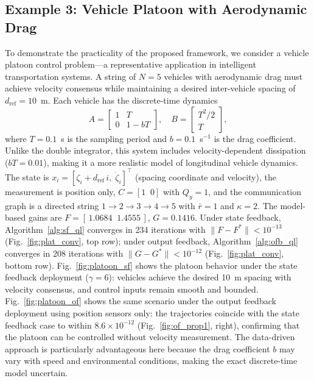 \documentclass[12pt]{elsarticle}
\theoremstyle{remark}
\begin{document}
\subsection{Example 3: Vehicle Platoon with Aerodynamic Drag}
\label{subsec:sim4}
To demonstrate the practicality of the proposed framework, we consider a vehicle platoon control problem---a representative application in intelligent transportation systems. A string of $N = 5$ vehicles with aerodynamic drag must achieve velocity consensus while maintaining a desired inter-vehicle spacing of $d_{\mathrm{ref}} = 10$~m. Each vehicle has the discrete-time dynamics
\begin{equation}
A = \begin{bmatrix} 1 & T \\ 0 & 1 - bT \end{bmatrix}, \quad B = \begin{bmatrix} T^2/2 \\ T \end{bmatrix},
\end{equation}
where $T = 0.1$~s is the sampling period and $b = 0.1$~s$^{-1}$ is the drag coefficient. Unlike the double integrator, this system includes velocity-dependent dissipation ($bT = 0.01$), making it a more realistic model of longitudinal vehicle dynamics. The state is $x_i = [\zeta_i + d_{\mathrm{ref}}\, i, \; \dot{\zeta}_i]^\top$ (spacing coordinate and velocity), the measurement is position only, $C = [1 \;\; 0]$ with $Q_y = 1$, and the communication graph is a directed string $1 \to 2 \to 3 \to 4 \to 5$ with $\bar{r} = 1$ and $\kappa = 2$. The model-based gains are $F = [\,1.0684 \;\; 1.4555\,]$, $G = 0.1416$.
Under state feedback, Algorithm~\ref{alg:sf_ql} converges in 234 iterations with $\|F - F^*\| < 10^{-13}$ (Fig.~\ref{fig:plat_conv}, top row); under output feedback, Algorithm~\ref{alg:ofb_ql} converges in 208 iterations with $\|G - G^*\| < 10^{-12}$ (Fig.~\ref{fig:plat_conv}, bottom row). Fig.~\ref{fig:platoon_sf} shows the platoon behavior under the state feedback deployment ($\gamma = 6$): vehicles achieve the desired 10~m spacing with velocity consensus, and control inputs remain smooth and bounded. Fig.~\ref{fig:platoon_of} shows the same scenario under the output feedback deployment using position sensors only: the trajectories coincide with the state feedback case to within $8.6 \times 10^{-12}$ (Fig.~\ref{fig:of_prop1}, right), confirming that the platoon can be controlled without velocity measurement. The data-driven approach is particularly advantageous here because the drag coefficient $b$ may vary with speed and environmental conditions, making the exact discrete-time model uncertain.
\end{document}
